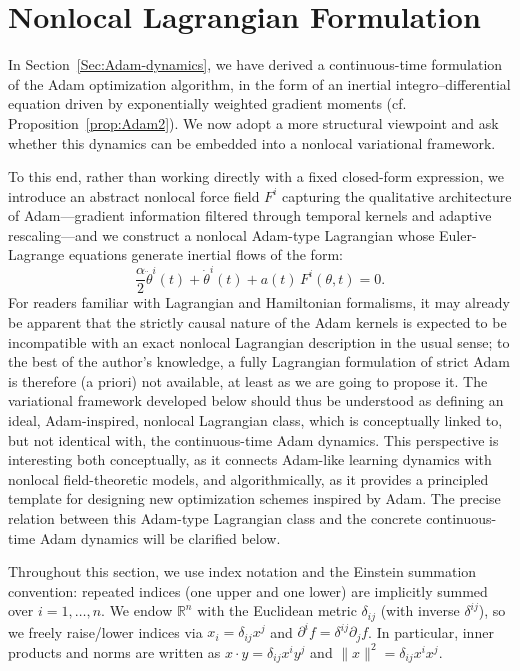 \documentclass{article} %
\begin{document}
\section{Nonlocal Lagrangian Formulation}\label{sec:Lagrangian}
In Section~\ref{Sec:Adam-dynamics}, we have derived a continuous-time formulation of the Adam optimization algorithm, in the form of an inertial integro–differential equation driven by exponentially weighted gradient moments (cf. Proposition~\ref{prop:Adam2}). We now adopt a more structural viewpoint and ask whether this dynamics can be embedded into a nonlocal variational framework.

To this end, rather than working directly with a fixed closed-form expression, we introduce an abstract nonlocal force field $F^i$ capturing the qualitative architecture of Adam---gradient information filtered through temporal kernels and adaptive rescaling---and we construct a nonlocal Adam-type Lagrangian whose Euler-Lagrange equations generate inertial flows of the form:
\[
\frac{\alpha}{2}\ddot\theta^i(t)+\dot\theta^i(t)+a(t)\,F^i(\theta,t)=0.
\]
For readers familiar with Lagrangian and Hamiltonian formalisms, it may already be apparent that the strictly causal nature of the Adam kernels is expected to be incompatible with an exact nonlocal Lagrangian description in the usual sense; to the best of the author's knowledge, a fully Lagrangian formulation of strict Adam is therefore (a priori) not available, at least as we are going to propose it. The variational framework developed below should thus be understood as defining an ideal, Adam-inspired, nonlocal Lagrangian class, which is conceptually linked to, but not identical with, the continuous-time Adam dynamics. This perspective is interesting both conceptually, as it connects Adam-like learning dynamics with nonlocal field-theoretic models, and algorithmically, as it provides a principled template for designing new optimization schemes inspired by Adam. The precise relation between this Adam-type Lagrangian class and the concrete continuous-time Adam dynamics will be clarified below.

Throughout this section, we use index notation and the Einstein summation convention: repeated indices (one upper and one lower) are implicitly summed over $i=1,\dots,n$.  We endow $\mathbb{R}^n$ with the Euclidean metric $\delta_{ij}$ (with inverse $\delta^{ij}$), so we freely raise/lower indices via $x_i=\delta_{ij}x^j$ and $\partial^i f=\delta^{ij}\partial_j f$. In particular, inner products and norms are written as $x\cdot y=\delta_{ij}x^i y^j$ and $\|x\|^2=\delta_{ij}x^i x^j$.
\end{document}

